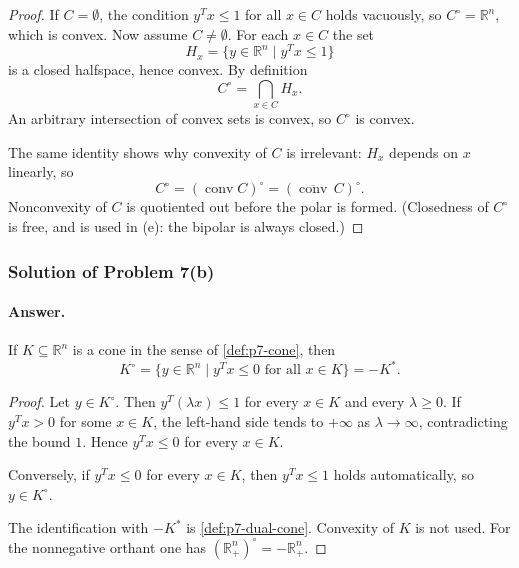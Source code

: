 \documentclass[11pt,a4paper]{article}
\begin{document}
\begin{proof}
If \(C=\emptyset\), the condition \(y^{T}x\le 1\) for all \(x\in C\) holds vacuously, so \(C^{\circ}=\mathbb{R}^{n}\), which is convex. Now assume \(C\neq\emptyset\). For each \(x\in C\) the set
\[
H_{x}
=
\bigl\{ y\in\mathbb{R}^{n} \mid y^{T}x\le 1 \bigr\}
\]
is a closed halfspace, hence convex. By definition
\[
C^{\circ}
=
\bigcap_{x\in C} H_{x}.
\]
An arbitrary intersection of convex sets is convex, so \(C^{\circ}\) is convex.

The same identity shows why convexity of \(C\) is irrelevant: \(H_{x}\) depends on \(x\) linearly, so
\[
C^{\circ}
=
(\operatorname{conv} C)^{\circ}
=
(\overline{\operatorname{conv}}\,C)^{\circ}.
\]
Nonconvexity of \(C\) is quotiented out before the polar is formed. (Closedness of \(C^{\circ}\) is free, and is used in (e): the bipolar is always closed.)
\end{proof}

\subsubsection{Solution of Problem 7(b)}

\paragraph{Answer.}
If \(K\subseteq\mathbb{R}^{n}\) is a cone in the sense of \cref{def:p7-cone}, then
\[
K^{\circ}
=
\bigl\{ y\in\mathbb{R}^{n} \mid y^{T}x\le 0\text{ for all }x\in K \bigr\}
=
-K^{*}.
\]

\begin{proof}
Let \(y\in K^{\circ}\). Then \(y^{T}(\lambda x)\le 1\) for every \(x\in K\) and every \(\lambda\ge 0\). If \(y^{T}x>0\) for some \(x\in K\), the left-hand side tends to \(+\infty\) as \(\lambda\to\infty\), contradicting the bound \(1\). Hence \(y^{T}x\le 0\) for every \(x\in K\).

Conversely, if \(y^{T}x\le 0\) for every \(x\in K\), then \(y^{T}x\le 1\) holds automatically, so \(y\in K^{\circ}\).

The identification with \(-K^{*}\) is \cref{def:p7-dual-cone}. Convexity of \(K\) is not used. For the nonnegative orthant one has \((\mathbb{R}^{n}_{+})^{\circ}=-\mathbb{R}^{n}_{+}\).
\end{proof}

\begin{center}
\end{center}
\end{document}
